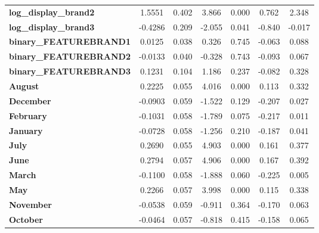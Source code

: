 \documentclass[a4paper,11pt]{article}
\begin{document}
\begin{center}
\begin{tabular}{lcccccc}
\textbf{log\_display\_brand2}  &       1.5551  &        0.402     &     3.866  &         0.000        &        0.762    &        2.348     \\
\textbf{log\_display\_brand3}  &      -0.4286  &        0.209     &    -2.055  &         0.041        &       -0.840    &       -0.017     \\
\textbf{binary\_FEATUREBRAND1} &       0.0125  &        0.038     &     0.326  &         0.745        &       -0.063    &        0.088     \\
\textbf{binary\_FEATUREBRAND2} &      -0.0133  &        0.040     &    -0.328  &         0.743        &       -0.093    &        0.067     \\
\textbf{binary\_FEATUREBRAND3} &       0.1231  &        0.104     &     1.186  &         0.237        &       -0.082    &        0.328     \\
\textbf{August}                &       0.2225  &        0.055     &     4.016  &         0.000        &        0.113    &        0.332     \\
\textbf{December}              &      -0.0903  &        0.059     &    -1.522  &         0.129        &       -0.207    &        0.027     \\
\textbf{February}              &      -0.1031  &        0.058     &    -1.789  &         0.075        &       -0.217    &        0.011     \\
\textbf{January}               &      -0.0728  &        0.058     &    -1.256  &         0.210        &       -0.187    &        0.041     \\
\textbf{July}                  &       0.2690  &        0.055     &     4.903  &         0.000        &        0.161    &        0.377     \\
\textbf{June}                  &       0.2794  &        0.057     &     4.906  &         0.000        &        0.167    &        0.392     \\
\textbf{March}                 &      -0.1100  &        0.058     &    -1.888  &         0.060        &       -0.225    &        0.005     \\
\textbf{May}                   &       0.2266  &        0.057     &     3.998  &         0.000        &        0.115    &        0.338     \\
\textbf{November}              &      -0.0538  &        0.059     &    -0.911  &         0.364        &       -0.170    &        0.063     \\
\textbf{October}               &      -0.0464  &        0.057     &    -0.818  &         0.415        &       -0.158    &        0.065     \\

\end{tabular}
\end{center}
\end{document}
